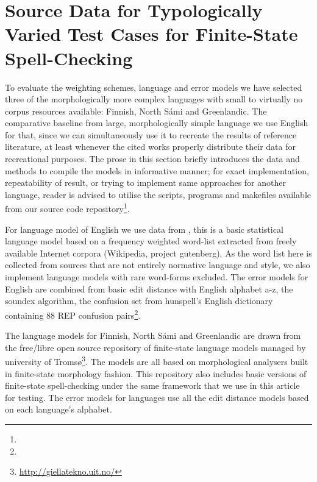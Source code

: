 \documentclass[a4paper,12pt]{article}
\begin{document}
\section{Source Data for Typologically Varied Test Cases for Finite-State Spell-Checking}
\label{sec:material}

To evaluate the weighting schemes, language and error models we have selected
three of the morphologically more complex languages with small to virtually no
corpus resources available: Finnish, North Sámi and Greenlandic. The comparative
baseline from large, morphologically simple language we use English for that,
since we can simultaneously use it to recreate the results of reference
literature, at least whenever the cited works properly distribute their data
for recreational purposes. The prose in this section briefly introduces the
data and methods to compile the models in informative manner; for exact
implementation, repeatability of result, or trying to implement same approaches
for another language, reader is advised to utilise the scripts, programs and
makefiles available from our source code repository\footnote{}.

For language model of English we use data from
\cite{norvig/2010,pirinen2012effects}, this is a basic statistical language
model based on a frequency weighted word-list extracted from freely available
Internet corpora (Wikipedia, project gutenberg). As the word list here is
collected from sources that are not entirely normative language and style, we
also implement language models with rare word-forms excluded. The error models
for English are combined from basic edit distance with English alphabet a-z,
the soundex algorithm, the confusion set from hunspell's English dictionary
containing 88 REP confusion pairs\footnote{}.

The language models for Finnish, North Sámi and Greenlandic are drawn from the
free/libre open source repository of finite-state language models managed by
university of Tromsø\footnote{\url{http://giellatekno.uit.no/}}. The models are all based on morphological analysers built in
finite-state morphology \cite{beesley2003finite} fashion. This repository also
includes basic versions of finite-state spell-checking under the same framework
that we use in this article for testing. The error models for languages use all
the edit distance models based on each language's alphabet. 
\end{document}
